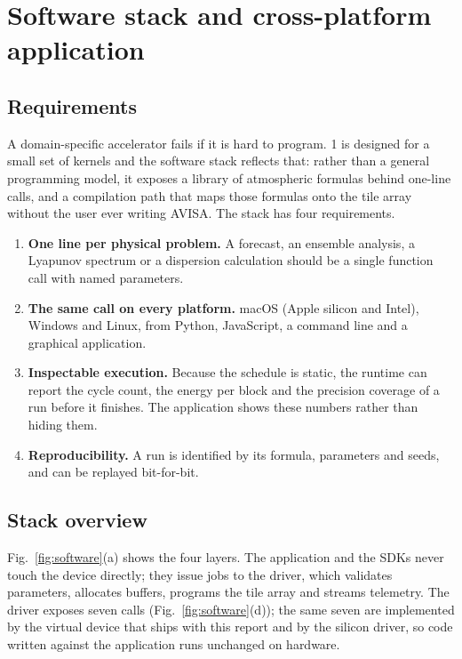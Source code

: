 \FloatBarrier
\section{Software stack and cross-platform application}\label{sec:software}

\subsection{Requirements}
A domain-specific accelerator fails if it is hard to program. \ac{1} is designed for a small set
of kernels and the software stack reflects that: rather than a general programming model, it
exposes a library of atmospheric formulas behind one-line calls, and a compilation path that maps
those formulas onto the tile array without the user ever writing AVISA. The stack has four
requirements.

\begin{enumerate}[leftmargin=1.4em,itemsep=1pt]
\item \textbf{One line per physical problem.} A forecast, an ensemble analysis, a Lyapunov
      spectrum or a dispersion calculation should be a single function call with named
      parameters.
\item \textbf{The same call on every platform.} macOS (Apple silicon and Intel), Windows and Linux,
      from Python, JavaScript, a command line and a graphical application.
\item \textbf{Inspectable execution.} Because the schedule is static, the runtime can report the
      cycle count, the energy per block and the precision coverage of a run before it finishes.
      The application shows these numbers rather than hiding them.
\item \textbf{Reproducibility.} A run is identified by its formula, parameters and seeds, and can
      be replayed bit-for-bit.
\end{enumerate}

\subsection{Stack overview}
Fig.~\ref{fig:software}(a) shows the four layers. The application and the SDKs never touch the
device directly; they issue jobs to the driver, which validates parameters, allocates buffers,
programs the tile array and streams telemetry. The driver exposes seven calls
(Fig.~\ref{fig:software}(d)); the same seven are implemented by the virtual device that ships with
this report and by the silicon driver, so code written against the application runs unchanged on
hardware.

